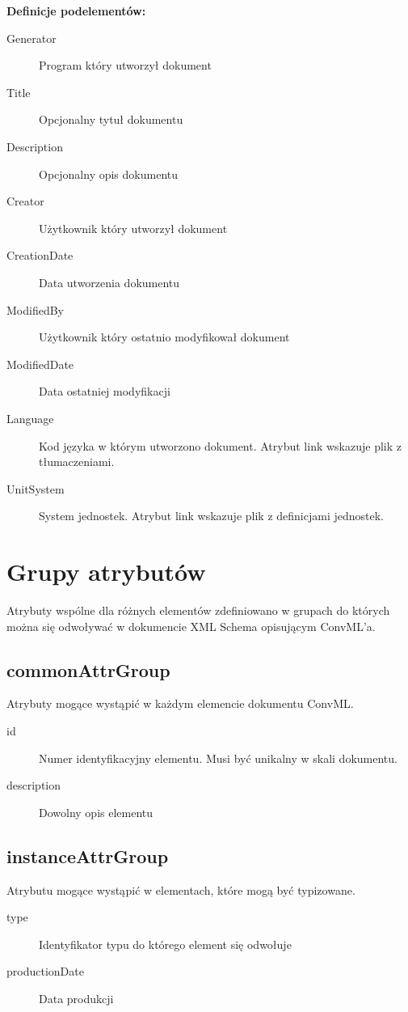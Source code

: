 \documentclass[12pt,a4paper]{article}
\begin{document}
\noindent\textbf{Definicje podelementów:}
\begin{description}
\item[Generator] Program który utworzył dokument
\item[Title] Opcjonalny tytuł dokumentu
\item[Description] Opcjonalny opis dokumentu
\item[Creator] Użytkownik który utworzył dokument
\item[CreationDate] Data utworzenia dokumentu
\item[ModifiedBy] Użytkownik który ostatnio modyfikował dokument
\item[ModifiedDate] Data ostatniej modyfikacji
\item[Language] Kod języka w którym utworzono dokument.
	Atrybut link wskazuje plik z tłumaczeniami.
\item[UnitSystem] System jednostek. Atrybut link wskazuje plik z definicjami jednostek. 
\end{description}

\section{Grupy atrybutów}
Atrybuty wspólne dla różnych elementów zdefiniowano w grupach do których można
się odwoływać w dokumencie XML Schema opisującym ConvML'a.

\subsection{commonAttrGroup}
Atrybuty mogące wystąpić w każdym elemencie dokumentu ConvML.

\begin{description}
\item[id] Numer identyfikacyjny elementu. Musi być unikalny w skali dokumentu.
\item[description] Dowolny opis elementu
\end{description}

\subsection{instanceAttrGroup}
Atrybutu mogące wystąpić w elementach, które mogą być typizowane.

\begin{description}
\item[type] Identyfikator typu do którego element się odwołuje
\item[productionDate] Data produkcji 
\end{description}
\end{document}
